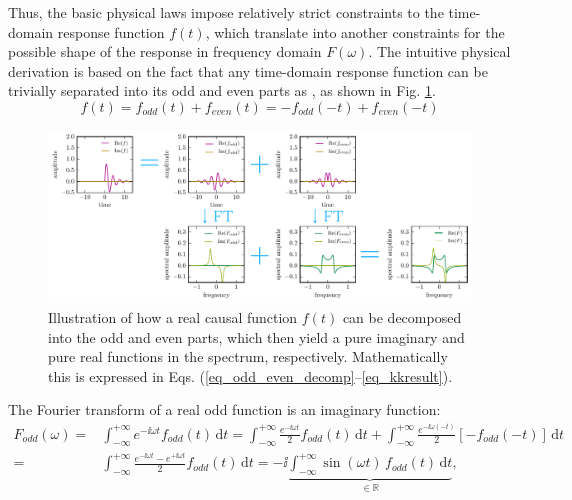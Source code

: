Thus, the basic physical laws impose relatively strict constraints to the time-domain response function $f(t)$, which translate into another constraints for the possible shape of the response in frequency domain $F(\omega)$. The intuitive physical derivation is based on the fact that any time-domain response function can be trivially separated into its odd and even parts as 
, as shown in Fig. \ref{fg_kk}. 
\begin{equation}f(t) = f_{odd}(t) + f_{even}(t) = -f_{odd}(-t) + f_{even}(-t) \label{eq_odd_even_decomp}\end{equation}
\begin{figure}[t] \caption{Illustration of how a real causal function $f(t)$ can be decomposed into the odd and even parts, which then yield a pure imaginary and pure real functions in the spectrum, respectively. Mathematically this is expressed in Eqs. (\ref{eq_odd_even_decomp}--\ref{eq_kkresult}).} \label{fg_kk} \centering 
	\includegraphics[width=17.5cm]{img/Kramers_Kronig_plot/kk.pdf}
\end{figure}
The Fourier transform of a real odd function is an imaginary function:
\begin{equation} 
\begin{split} 
F_{odd}(\omega)=& \int_{-\infty}^{+\infty} e^{-\ii \omega t} f_{odd}(t) \,\mbox{d}t = 
		 \int_{-\infty}^{+\infty} \frac{e^{-\ii \omega   t }}{2} f_{odd}(t) \,\mbox{d}t 
		   +  \int_{-\infty}^{+\infty} \frac{e^{-\ii \omega (-t)}}{2} [-f_{odd}(-t)] \,\mbox{d}t  \\
		 =&   \int_{-\infty}^{+\infty} \frac{e^{-\ii \omega t}-e^{+\ii \omega t}}{2} f_{odd}(t) \,\mbox{d}t 
		 = -\ii \underbrace{\int_{-\infty}^{+\infty} \sin(\omega t) \, f_{odd}(t) \,\mbox{d}t}_{\mbox{$\in \mathbb{R}$}},
\end{split} 
\label{eq_kkF}\end{equation}
